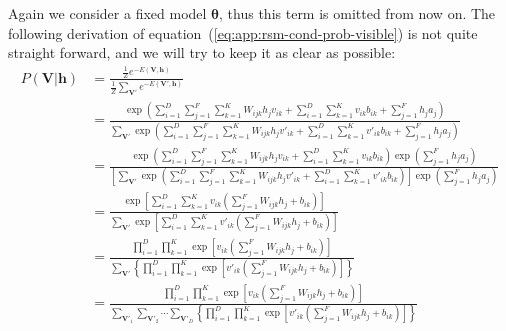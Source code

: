 Again we consider a fixed model $\bm{\theta}$, thus this term is omitted from now on. 
The following derivation of equation~(\ref{eq:app:rsm-cond-prob-visible}) is not quite straight forward, and we will try to keep it as clear as possible:
\begin{align}
    \label{eq:app:rsm-cond-prob-visible-init}
    P(\mathbf{V} | \mathbf{h}) &= \frac{\frac{1}{Z} e^{-E(\mathbf{V}, \mathbf{h})}}{\frac{1}{Z} \sum\limits_{\mathbf{V}'} e^{-E(\mathbf{V}', \mathbf{h})}} \\ %
    &= \frac{\exp{\left( \sum\limits^{D}_{i=1} \sum\limits^{F}_{j=1} \sum\limits^{K}_{k=1} W_{ijk} h_{j} v_{ik} + \sum\limits^{D}_{i=1} \sum\limits^{K}_{k=1} v_{ik} b_{ik} + \sum\limits^{F}_{j=1} h_{j} a_{j} \right)}}{\sum\limits_{\mathbf{V}'} \exp{\left( \sum\limits^{D}_{i=1} \sum\limits^{F}_{j=1} \sum\limits^{K}_{k=1} W_{ijk} h_{j} v'_{ik} + \sum\limits^{D}_{i=1} \sum\limits^{K}_{k=1} v'_{ik} b_{ik} + \sum\limits^{F}_{j=1} h_{j} a_{j}\right)}} \nonumber \\ %
    &= \frac{\exp{\left( \sum\limits^{D}_{i=1} \sum\limits^{F}_{j=1} \sum\limits^{K}_{k=1} W_{ijk} h_{j} v_{ik} + \sum\limits^{D}_{i=1} \sum\limits^{K}_{k=1} v_{ik} b_{ik}\right) \exp{\left( \sum\limits^{F}_{j=1} h_{j} a_{j}\right)}}}{\left[ \sum\limits_{\mathbf{V}'} \exp{\left( \sum\limits^{D}_{i=1} \sum\limits^{F}_{j=1} \sum\limits^{K}_{k=1} W_{ijk} h_{j} v'_{ik} + \sum\limits^{D}_{i=1} \sum\limits^{K}_{k=1} v'_{ik} b_{ik}\right)}\right] \exp{\left( \sum\limits^{F}_{j=1} h_{j} a_{j}\right)}} \nonumber \\ %
    &= \frac{\exp{\left[ \sum\limits^{D}_{i=1} \sum\limits^{K}_{k=1} v_{ik} \left( \sum\limits^{F}_{j=1} W_{ijk} h_{j} + b_{ik}\right)\right]}}{\sum\limits_{\mathbf{V}'} \exp{\left[ \sum\limits^{D}_{i=1} \sum\limits^{K}_{k=1} v'_{ik} \left( \sum\limits^{F}_{j=1} W_{ijk} h_{j} + b_{ik}\right)\right]}} \nonumber \\ %
    &= \frac{\prod\limits^{D}_{i=1} \prod\limits^{K}_{k=1} \exp{\left[ v_{ik} \left( \sum\limits^{F}_{j=1} W_{ijk} h_{j} + b_{ik}\right)\right]}}{\sum\limits_{\mathbf{V}'} \left\{ \prod\limits^{D}_{i=1} \prod\limits^{K}_{k=1} \exp{\left[ v'_{ik} \left( \sum\limits^{F}_{j=1} W_{ijk} h_{j} + b_{ik}\right)\right]}\right\}} \nonumber \\ %
    &= \frac{\prod\limits^{D}_{i=1} \prod\limits^{K}_{k=1} \exp{\left[ v_{ik} \left( \sum\limits^{F}_{j=1} W_{ijk} h_{j} + b_{ik}\right)\right]}}{\sum\limits_{\mathbf{V}'_{1}} \sum\limits_{\mathbf{V}'_{2}} \cdots \sum\limits_{\mathbf{V}'_{D}} \left\{ \prod\limits^{D}_{i=1} \prod\limits^{K}_{k=1} \exp{\left[ v'_{ik} \left( \sum\limits^{F}_{j=1} W_{ijk} h_{j} + b_{ik}\right)\right]}\right\}} \nonumber \\ %

\end{align}
